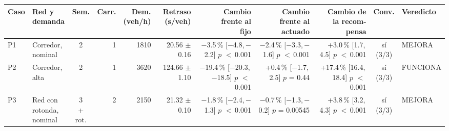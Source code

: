 \begin{table}[H]
\centering
\scriptsize
\setlength{\tabcolsep}{1.5pt}
\begin{tabular}{llcrrrrrrcl}
\toprule
Caso & \makecell[l]{Red y\\demanda} & Sem. & Carr. & \makecell{Dem.\\(veh/h)} & \makecell{Retraso\\(s/veh)} & \makecell{Cambio\\frente al\\fijo} & \makecell{Cambio\\frente al\\actuado} & \makecell{Cambio de\\la recom-\\pensa} & Conv. & Veredicto \\
\midrule
P1 & \makecell[l]{Corredor,\\{}nominal} & 2 & 1 & 1810 & \makecell[r]{20.56\\{}$\pm$ 0.16} & \makecell[r]{$-$3.5\,\%\\{}[$-$4.8,\,$-$2.2]\\$p$ $<$\,0.001} & \makecell[r]{$-$2.4\,\%\\{}[$-$3.3,\,$-$1.6]\\$p$ $<$\,0.001} & \makecell[r]{+3.0\,\%\\{}[1.7,\,4.5]\\$p$ $<$\,0.001} & \makecell[c]{sí\\{}(3/3)} & MEJORA \\
P2 & \makecell[l]{Corredor,\\{}alta} & 2 & 1 & 3620 & \makecell[r]{124.66\\{}$\pm$ 1.10} & \makecell[r]{$-$19.4\,\%\\{}[$-$20.3,\,$-$18.5]\\$p$ $<$\,0.001} & \makecell[r]{+0.4\,\%\\{}[$-$1.7,\,2.5]\\$p$ = 0.44} & \makecell[r]{+17.4\,\%\\{}[16.4,\,18.4]\\$p$ $<$\,0.001} & \makecell[c]{sí\\{}(3/3)} & FUNCIONA \\
P3 & \makecell[l]{Red con\\{}rotonda,\\{}nominal} & \makecell[c]{3\\{}+ rot.} & 2 & 2150 & \makecell[r]{21.32\\{}$\pm$ 0.10} & \makecell[r]{$-$1.8\,\%\\{}[$-$2.4,\,$-$1.3]\\$p$ $<$\,0.001} & \makecell[r]{$-$0.7\,\%\\{}[$-$1.3,\,$-$0.2]\\$p$ = 0.00545} & \makecell[r]{+3.8\,\%\\{}[3.2,\,4.3]\\$p$ $<$\,0.001} & \makecell[c]{sí\\{}(3/3)} & MEJORA \\

\end{tabular}
\end{table}
